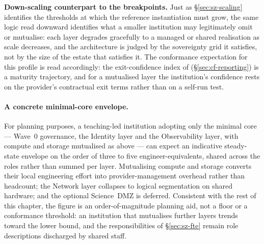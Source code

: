 \noindent\textbf{Down-scaling counterpart to the breakpoints.}
Just as \S\ref{sec:sz-scaling} identifies the thresholds at which the
reference instantiation must grow, the same logic read downward
identifies what a smaller institution may legitimately omit or
mutualise: each layer degrades gracefully to a managed or shared
realisation as scale decreases, and the architecture is judged by the
sovereignty grid it satisfies, not by the size of the estate that
satisfies it. The conformance expectation for this profile is read
accordingly: the exit-confidence index of 
(\S\ref{sec:cf-reporting}) is a maturity trajectory, and for a
mutualised layer the institution's confidence rests on the provider's
contractual exit terms rather than on a self-run test.

\paragraph{A concrete minimal-core envelope.} For planning purposes, a
teaching-led institution adopting only the minimal core --- Wave~0
governance, the Identity layer and the Observability layer, with compute
and storage mutualised as above --- can expect an indicative steady-state
envelope on the order of three to five engineer-equivalents, shared across
the roles rather than summed per layer. Mutualising compute and storage
converts their local engineering effort into provider-management overhead
rather than headcount; the Network layer collapses to logical segmentation
on shared hardware; and the optional Science~DMZ is deferred. Consistent
with the rest of this chapter, the figure is an order-of-magnitude planning
aid, not a floor or a conformance threshold: an institution that mutualises
further layers trends toward the lower bound, and the responsibilities of
\S\ref{sec:sz-fte} remain role descriptions discharged by shared staff.
